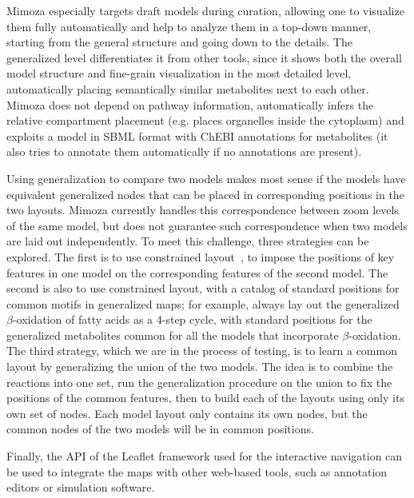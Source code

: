 \documentclass{bmcart}
\begin{document}
Mimoza especially targets draft models during curation, allowing one to visualize them fully automatically and help to analyze them in a top-down manner, starting from the general structure and going down to the details. The generalized level differentiates it from other tools, since it shows both the overall model structure and fine-grain visualization in the most detailed level, automatically placing semantically similar metabolites next to each other. Mimoza does not depend on pathway information, automatically infers the relative compartment placement (e.g. places organelles inside the cytoplasm) and exploits a model in SBML format with ChEBI annotations for metabolites (it also tries to annotate them automatically if no annotations are present).

Using generalization to compare two models makes most sense if the models have equivalent generalized nodes that can be placed in corresponding positions in the two layouts. Mimoza currently handles this correspondence between zoom levels of the same model, but does not guarantee such correspondence when two models are laid out independently.
To meet this challenge, three strategies can be explored.
The first is to use constrained layout~\cite{Karl-FriedrichBohringer}, to impose the positions of key features in one model on the corresponding features of the second model.
The second is also to use constrained layout, with a catalog of standard positions for common motifs in generalized maps; for example, always lay out the generalized $\beta$-oxidation of fatty acids as a 4-step cycle, with standard positions for the generalized metabolites common for all the models that incorporate $\beta$-oxidation.
The third strategy, which we are in the process of testing, is to learn a common layout by generalizing the union of the two models. The idea is to combine the reactions into one set, run the generalization procedure on the union to fix the positions of the common features, then to build each of the layouts using only its own set of nodes. Each model layout only contains its own nodes, but the common nodes of the two models will be in common positions.


Finally, the API of the Leaflet framework used for the interactive navigation can be used to integrate the maps with other web-based tools, such as annotation editors or simulation software.
\end{document}
